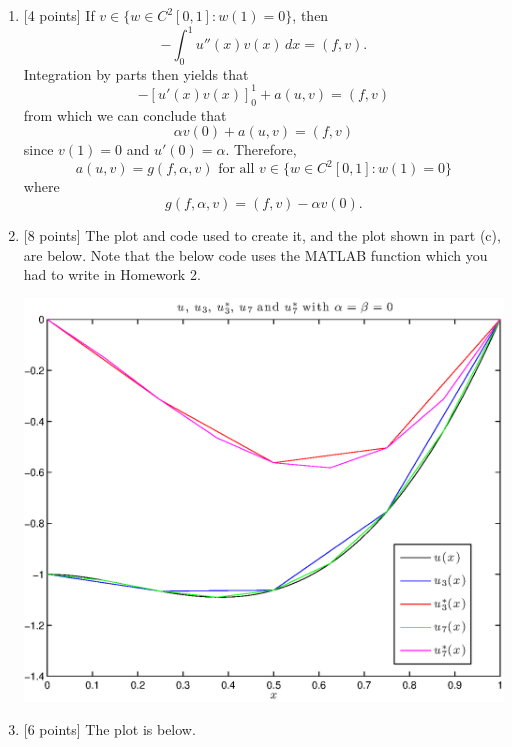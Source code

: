 \begin{solution}
\begin{enumerate}
\item {[4 points]} If $v\in\{w\in C^2[0,1]:w(1)=0\}$, then
\[
-\int_0^1u''(x)v(x)\,dx=(f,v).
\]
Integration by parts then yields that
\[
-[u'(x)v(x)]_0^1+a(u,v)=(f,v)
\]
from which we can conclude that
\[
\alpha v(0)+a(u,v)=(f,v)
\]
since $v(1)=0$ and $u'(0)=\alpha$. Therefore,
\[
a(u,v)=g(f,\alpha,v)\mbox{ for all }v\in\{w\in C^2[0,1]:w(1)=0\}
\]
where
\[
g(f,\alpha,v)=(f,v)-\alpha v(0).
\]

\vspace*{1em}
\item {[8 points]} The plot and code used to create it, and the plot shown in part (c), are below. Note that the below code uses the MATLAB function which you had to write in Homework 2.

\begin{center}
\includegraphics[scale=0.7]{hw37c.eps}
\end{center}



\vspace*{1em}
\item {[6 points]} The plot is below.


\end{enumerate}
\end{solution}
